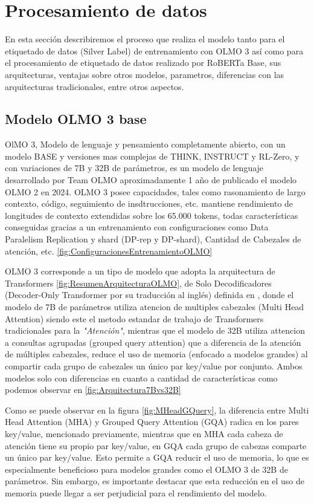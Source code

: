 \chapter{\textbf{Procesamiento de datos}}
\label{cha:procesamiento_datos}

En esta sección describiremos el proceso que realiza el modelo tanto para el etiquetado de datos (Silver Label) de entrenamiento con OLMO 3 así como para el procesamiento de etiquetado de datos realizado por RoBERTa Base, sus arquitecturas, ventajas sobre otros modelos, parametros, diferencias con las arquitecturas tradicionales, entre otros aspectos.

\section{Modelo OLMO 3 base}
OlMO 3, Modelo de lenguaje y pensamiento completamente abierto, con un modelo BASE y versiones mas complejas de THINK, INSTRUCT y RL-Zero, y con variaciones de 7B y 32B de parámetros, es un modelo de lenguaje desarrollado por Team OLMO \cite{olmo2025olmo3} aproximadamente 1 año de publicado el modelo OLMO 2 \textcite{groeneveld2025olmo2} en 2024. OLMO 3 posee capacidades, tales como rasonamiento de largo contexto, código, seguimiento de insdtrucciones, etc. mantiene rendimiento de longitudes de contexto extendidas sobre los 65.000 tokens, todas características conseguidas gracias a un entrenamiento con configuraciones como Data Paralelism Replication y shard (DP-rep y DP-shard), Cantidad de Cabezales de atención, etc. \ref{fig:ConfiguracionesEntrenamientoOLMO} 

OLMO 3 corresponde a un tipo de modelo que adopta la arquitectura de Transformers \ref{fig:ResumenArquitecturaOLMO}, de Solo Decodificadores (Decoder-Only Transformer por su traducción al inglés) definida en \textcite{vaswani2017attention}, donde el modelo de 7B de parámetros utiliza atencion de multiples cabezales (Multi Head Attention) siendo este el metodo estandar de trabajo de Transformers tradicionales para la \textit{"Atención"}, mientras que el modelo de 32B utiliza attencion a consultas agrupadas (grouped query attention) \textcite{ainslie-etal-2023-gqa} que a diferencia de la atención de múltiples cabezales, reduce el uso de memoria (enfocado a modelos grandes) al compartir cada grupo de cabezales un único par key/value por conjunto. Ambos modelos solo con diferencias en cuanto a cantidad de características como podemos observar en \ref{fig:Arquitectura7Bvs32B} 

Como se puede observar en la figura \ref{fig:MHeadGQuery}, la diferencia entre Multi Head Attention (MHA) y Grouped Query Attention (GQA) radica en los pares key/value, mencionado previamente, mientras que en MHA cada cabeza de atención tiene su propio par key/value, en GQA cada grupo de cabezas comparte un único par key/value. Esto permite a GQA reducir el uso de memoria, lo que es especialmente beneficioso para modelos grandes como el OLMO 3 de 32B de parámetros. Sin embargo, es importante destacar que esta reducción en el uso de memoria puede llegar a ser perjudicial para el rendimiento del modelo.

